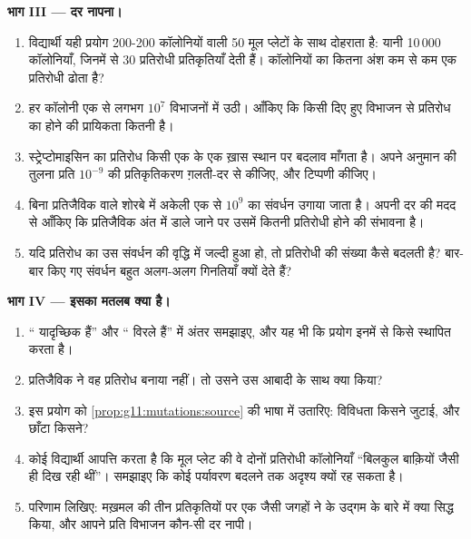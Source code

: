 \begin{problem}
\medskip
\noindent\textbf{भाग III --- दर नापना।}
\begin{enumerate}[resume]
  \item विद्यार्थी यही प्रयोग 200-200 कॉलोनियों वाली 50 मूल प्लेटों के
        साथ दोहराता है: यानी 10\,000 कॉलोनियाँ, जिनमें से 30 प्रतिरोधी
        प्रतिकृतियाँ देती हैं। कॉलोनियों का कितना अंश कम से कम एक
        प्रतिरोधी  ढोता है?
  \item हर कॉलोनी एक  से लगभग $10^7$  विभाजनों में उठी।
        आँकिए कि किसी दिए हुए विभाजन से प्रतिरोध का  होने की
        प्रायिकता कितनी है।
  \item स्ट्रेप्टोमाइसिन का प्रतिरोध किसी एक  के एक ख़ास स्थान पर
        बदलाव माँगता है। अपने अनुमान की तुलना प्रति 
        $10^{-9}$ की प्रतिकृतिकरण ग़लती-दर से कीजिए, और टिप्पणी कीजिए।
  \item बिना प्रतिजैविक वाले शोरबे में अकेली एक  से $10^9$
         का संवर्धन उगाया जाता है। अपनी दर की मदद से आँकिए कि
        प्रतिजैविक अंत में डाले जाने पर उसमें कितनी प्रतिरोधी 
        होने की संभावना है।
  \item यदि प्रतिरोध का  उस संवर्धन की वृद्धि में जल्दी हुआ
        हो, तो प्रतिरोधी  की संख्या कैसे बदलती है? बार-बार किए गए
        संवर्धन बहुत अलग-अलग गिनतियाँ क्यों देते हैं?
\end{enumerate}

\medskip
\noindent\textbf{भाग IV --- इसका मतलब क्या है।}
\begin{enumerate}[resume]
  \item `` यादृच्छिक हैं'' और `` विरले हैं'' में
        अंतर समझाइए, और यह भी कि प्रयोग इनमें से किसे स्थापित करता है।
  \item प्रतिजैविक ने वह प्रतिरोध बनाया नहीं। तो उसने उस आबादी के साथ
        क्या किया?
  \item इस प्रयोग को \cref{prop:g11:mutations:source} की भाषा में
        उतारिए: विविधता किसने जुटाई, और छाँटा किसने?
  \item कोई विद्यार्थी आपत्ति करता है कि मूल प्लेट की वे दोनों प्रतिरोधी
        कॉलोनियाँ ``बिलकुल बाक़ियों जैसी ही दिख रही थीं''। समझाइए कि कोई
         पर्यावरण बदलने तक अदृश्य क्यों रह सकता है।
  \item परिणाम लिखिए: मख़मल की तीन प्रतिकृतियों पर एक जैसी जगहों ने
         के उद्गम के बारे में क्या सिद्ध किया, और आपने प्रति
        विभाजन कौन-सी दर नापी।
\end{enumerate}
\end{problem}
